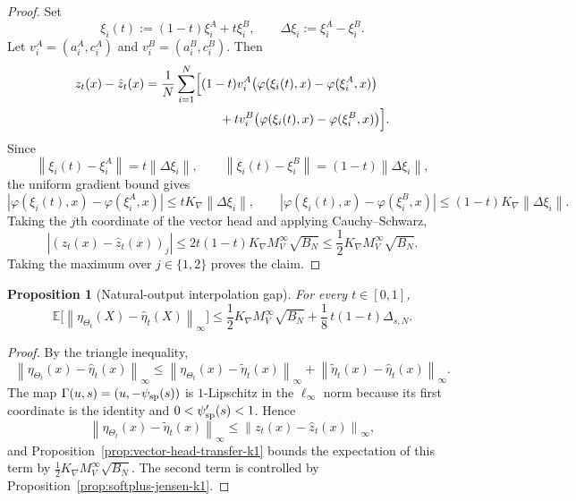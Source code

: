 \documentclass[11pt]{article}
\newtheorem{proposition}[theorem]{Proposition}
\theoremstyle{definition}
\newcommand{\E}{\mathbb{E}}
\newcommand{\norm}[1]{\left\lVert #1 \right\rVert}
\begin{document}
\begin{proof}
Set
\[
  \xi_i(t):=(1-t)\xi_i^A+t\xi_i^B,
  \qquad
  \Delta\xi_i:=\xi_i^A-\xi_i^B.
\]
Let $v_i^A=(a_i^A,c_i^A)$ and $v_i^B=(a_i^B,c_i^B)$. Then
\begin{align*}
  z_t(x)-\hat z_t(x)
  &=
  \frac1N\sum_{i=1}^N
  \Bigl[
    (1-t)v_i^A\bigl(\varphi(\xi_i(t),x)-\varphi(\xi_i^A,x)\bigr)
    \\
  &\qquad\qquad\qquad
    +
    tv_i^B\bigl(\varphi(\xi_i(t),x)-\varphi(\xi_i^B,x)\bigr)
  \Bigr].
\end{align*}
Since
\[
  \norm{\xi_i(t)-\xi_i^A}=t\norm{\Delta\xi_i},
  \qquad
  \norm{\xi_i(t)-\xi_i^B}=(1-t)\norm{\Delta\xi_i},
\]
the uniform gradient bound gives
\[
  |\varphi(\xi_i(t),x)-\varphi(\xi_i^A,x)|
  \le
  tK_{\nabla}\norm{\Delta\xi_i},
  \qquad
  |\varphi(\xi_i(t),x)-\varphi(\xi_i^B,x)|
  \le
  (1-t)K_{\nabla}\norm{\Delta\xi_i}.
\]
Taking the $j$th coordinate of the vector head and applying Cauchy--Schwarz,
\[
  |(z_t(x)-\hat z_t(x))_j|
  \le
  2t(1-t)K_{\nabla}M_V^\infty\sqrt{B_N}
  \le
  \frac12 K_{\nabla}M_V^\infty\sqrt{B_N}.
\]
Taking the maximum over $j\in\{1,2\}$ proves the claim.
\end{proof}

\begin{proposition}[Natural-output interpolation gap]
\label{prop:natural-output-gap-k1}
For every $t\in[0,1]$,
\begin{equation}
  \E\big[\norm{\eta_{\Theta_t}(X)-\hat\eta_t(X)}_\infty\big]
  \le
  \frac12 K_{\nabla}M_V^\infty\sqrt{B_N}
  +
  \frac18\,t(1-t)\Delta_{s,N}.
  \label{eq:natural-gap-k1}
\end{equation}
\end{proposition}

\begin{proof}
By the triangle inequality,
\[
  \norm{\eta_{\Theta_t}(x)-\hat\eta_t(x)}_\infty
  \le
  \norm{\eta_{\Theta_t}(x)-\tilde\eta_t(x)}_\infty
  +
  \norm{\tilde\eta_t(x)-\hat\eta_t(x)}_\infty.
\]
The map $\Gamma(u,s)=(u,-\psi_{\rm sp}(s))$ is $1$-Lipschitz in the
$\ell_\infty$ norm because its first coordinate is the identity and
$0<\psi'_{\rm sp}(s)<1$. Hence
\[
  \norm{\eta_{\Theta_t}(x)-\tilde\eta_t(x)}_\infty
  \le
  \norm{z_t(x)-\hat z_t(x)}_\infty,
\]
and Proposition~\ref{prop:vector-head-transfer-k1} bounds the expectation of
this term by $\frac12 K_{\nabla}M_V^\infty\sqrt{B_N}$. The second term is
controlled by Proposition~\ref{prop:softplus-jensen-k1}.
\end{proof}
\end{document}
